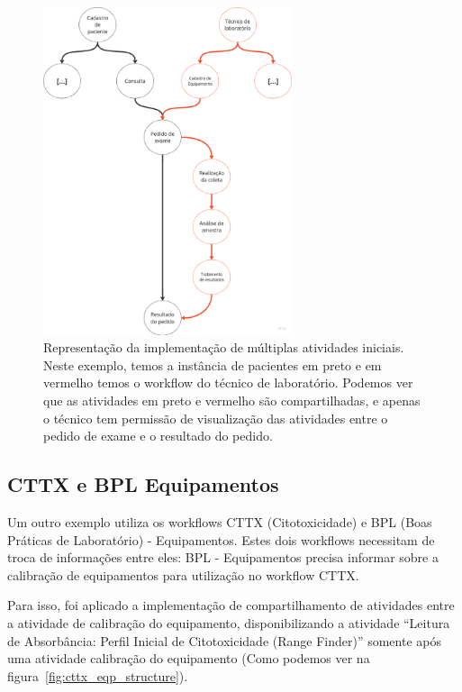 \begin{figure}
    \centering
    \includegraphics[width=0.65\textwidth]{imgs/Exemplo/exemplo_pedido_exame.png}
    \caption{Representação da implementação de múltiplas atividades iniciais. Neste exemplo, temos a instância de pacientes em preto e em vermelho temos o workflow do técnico de laboratório. Podemos ver que as atividades em preto e vermelho são compartilhadas, e apenas o técnico tem permissão de visualização das atividades entre o pedido de exame e o resultado do pedido.}
    \label{fig:segunda_implementacao}
\end{figure}


\subsection{CTTX e BPL Equipamentos} \label{sec:cttx_bpl}

Um outro exemplo utiliza os workflows CTTX (Citotoxicidade) e BPL (Boas Práticas de Laboratório) - Equipamentos. Estes dois workflows necessitam de troca de informações entre eles: BPL - Equipamentos precisa informar sobre a calibração de equipamentos para utilização no workflow CTTX.

Para isso, foi aplicado a implementação de compartilhamento de atividades entre a atividade de calibração do equipamento, disponibilizando a atividade ``Leitura de Absorbância: Perfil Inicial de Citotoxicidade (Range Finder)'' somente após uma atividade calibração do equipamento (Como podemos ver na figura~\ref{fig:cttx_eqp_structure}).

